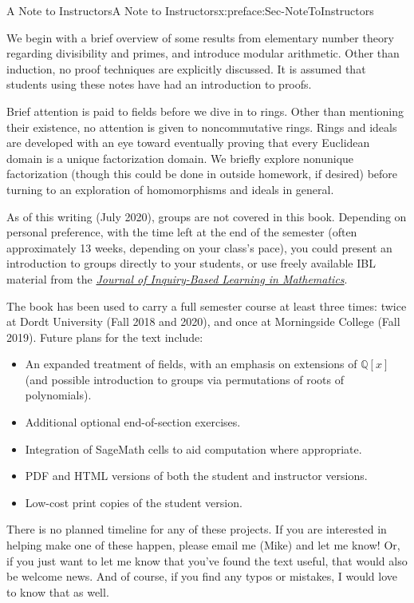 \documentclass[oneside,10pt,]{book}
\numberwithin{equation}{section}
\def\Q{{\mathbb Q}}
\begin{document}
\begin{preface}{A Note to Instructors}{}{A Note to Instructors}{}{}{x:preface:Sec-NoteToInstructors}
\begin{itemize}[label=\textbullet]
\end{itemize}
%
\par
We begin with a brief overview of some results from elementary number theory regarding divisibility and primes, and introduce modular arithmetic. Other than induction, no proof techniques are explicitly discussed. It is assumed that students using these notes have had an introduction to proofs.%
\par
Brief attention is paid to fields before we dive in to rings. Other than mentioning their existence, no attention is given to noncommutative rings. Rings and ideals are developed with an eye toward eventually proving that every Euclidean domain is a unique factorization domain. We briefly explore nonunique factorization (though this could be done in outside homework, if desired) before turning to an exploration of homomorphisms and ideals in general.%
\par
As of this writing (July 2020), groups are not covered in this book. Depending on personal preference, with the time left at the end of the semester (often approximately 1\textendash{}3 weeks, depending on your class's pace), you could present an introduction to groups directly to your students, or use freely available IBL material from the \href{http://jiblm.org/}{\emph{Journal of Inquiry-Based Learning in Mathematics}}.%
\par
The book has been used to carry a full semester course at least three times: twice at Dordt University (Fall 2018 and 2020), and once at Morningside College (Fall 2019). Future plans for the text include:%
\begin{itemize}[label=\textbullet]
\item{}An expanded treatment of fields, with an emphasis on extensions of \(\Q[x]\) (and possible introduction to groups via permutations of roots of polynomials).%
\item{}Additional optional end-of-section exercises.%
\item{}Integration of SageMath cells to aid computation where appropriate.%
\item{}PDF and HTML versions of both the student and instructor versions.%
\item{}Low-cost print copies of the student version.%
\end{itemize}
There is no planned timeline for any of these projects. If you are interested in helping make one of these happen, please email me (Mike) and let me know! Or, if you just want to let me know that you've found the text useful, that would also be welcome news. And of course, if you find any typos or mistakes, I would love to know that as well.%
\end{preface}
\end{document}
